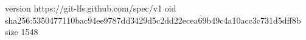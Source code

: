 version https://git-lfs.github.com/spec/v1
oid sha256:5350477110bac94ee9787dd3429d5c2dd22ecea69b49c4a10acc3c731d5dff8b
size 1548
